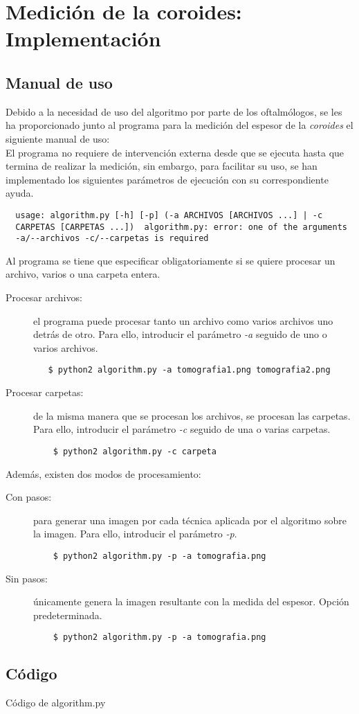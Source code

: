 \chapter{Medición de la coroides: Implementación}
\section{Manual de uso}
Debido a la necesidad de uso del algoritmo por parte de los
oftalmólogos, se les ha proporcionado junto al programa para la
medición del espesor de la \emph{\gls{coroides}} el siguiente manual de uso:\\
El programa no requiere de intervención externa desde que se ejecuta
hasta que termina de realizar la medición, sin embargo, para facilitar
su uso, se han implementado los siguientes parámetros de ejecución con
su correspondiente ayuda.
\begin{verbatim}
  usage: algorithm.py [-h] [-p] (-a ARCHIVOS [ARCHIVOS ...] | -c
  CARPETAS [CARPETAS ...])  algorithm.py: error: one of the arguments
  -a/--archivos -c/--carpetas is required
\end{verbatim}

Al programa se tiene que especificar obligatoriamente si se
quiere procesar un archivo, varios o una carpeta entera.
\begin{description}
\item[Procesar archivos:] el programa puede procesar tanto un archivo
  como varios archivos uno detrás de otro. Para ello, introducir el
  parámetro \emph{-a} seguido de uno o varios archivos.
 \begin{verbatim}
   $ python2 algorithm.py -a tomografia1.png tomografia2.png
  \end{verbatim}
\item[Procesar carpetas:] de la misma manera que se procesan los
  archivos, se procesan las carpetas. Para ello, introducir el
  parámetro \emph{-c} seguido de una o varias carpetas.
 \begin{verbatim}
    $ python2 algorithm.py -c carpeta
  \end{verbatim}
\end{description}

Además, existen dos modos de procesamiento:
\begin{description}
\item[Con pasos:] para generar una imagen por cada técnica aplicada
  por el algoritmo sobre la imagen. Para ello, introducir el parámetro
  \emph{-p}.
  \begin{verbatim}
    $ python2 algorithm.py -p -a tomografia.png
  \end{verbatim}
\item[Sin pasos:] únicamente genera la imagen resultante con la medida
  del espesor. Opción predeterminada.
  \begin{verbatim}
    $ python2 algorithm.py -p -a tomografia.png
  \end{verbatim}
\end{description}

\section{Código}

\begin{codigo_python}
  \caption{Código de algorithm.py}
  \inputminted[fontsize=\scriptsize, linenos, breaklines]{python}{../OpenCV/algorithm.py}
\end{codigo_python}